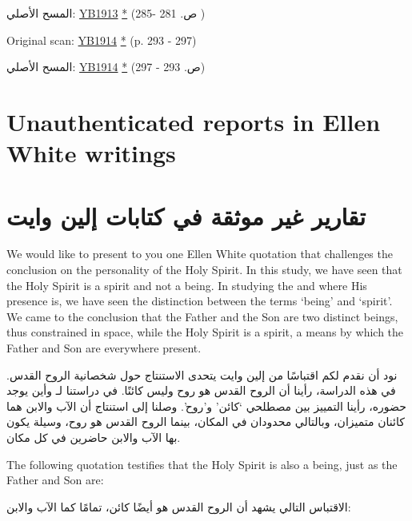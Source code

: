المسح الأصلي: \href{https://documents.adventistarchives.org/Yearbooks/YB1913.pdf#search=Yearbook%201913}{YB1913} \href{https://forgotten-pillar.s3.us-east-2.amazonaws.com/YB1913.pdf}{*} (ص. 281 -285 )


Original scan: \href{https://documents.adventistarchives.org/Yearbooks/YB1914.pdf#search=Yearbook%201914}{YB1914} \href{https://forgotten-pillar.s3.us-east-2.amazonaws.com/YB1914.pdf}{*} (p. 293 - 297)


المسح الأصلي: \href{https://documents.adventistarchives.org/Yearbooks/YB1914.pdf#search=Yearbook%201914}{YB1914} \href{https://forgotten-pillar.s3.us-east-2.amazonaws.com/YB1914.pdf}{*} (ص. 293 - 297)


\section*{Unauthenticated reports in Ellen White writings}


\section*{تقارير غير موثقة في كتابات إلين وايت}


\label{appendix:unauthenticated-reports}
We would like to present to you one Ellen White quotation that challenges the conclusion on the personality of the Holy Spirit. In this study, we have seen that the Holy Spirit is a spirit and not a being. In studying the  and where His presence is, we have seen the distinction between the terms ‘being’ and ‘spirit’. We came to the conclusion that the Father and the Son are two distinct beings, thus constrained in space, while the Holy Spirit is a spirit, a means by which the Father and Son are everywhere present.


\label{appendix:unauthenticated-reports}
نود أن نقدم لكم اقتباسًا من إلين وايت يتحدى الاستنتاج حول شخصانية الروح القدس. في هذه الدراسة، رأينا أن الروح القدس هو روح وليس كائنًا. في دراستنا لـ  وأين يوجد حضوره، رأينا التمييز بين مصطلحي ‘كائن’ و'روح’. وصلنا إلى استنتاج أن الآب والابن هما كائنان متميزان، وبالتالي محدودان في المكان، بينما الروح القدس هو روح، وسيلة يكون بها الآب والابن حاضرين في كل مكان.


The following quotation testifies that the Holy Spirit is also a being, just as the Father and Son are:


الاقتباس التالي يشهد أن الروح القدس هو أيضًا كائن، تمامًا كما الآب والابن:


